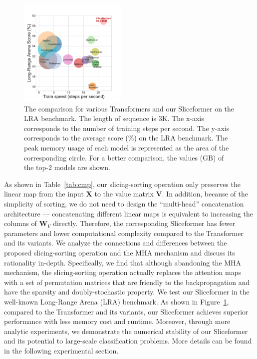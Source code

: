 \begin{figure}
  \centering
    \includegraphics[width=0.46\textwidth]{figures/lra-3.pdf}
    \caption{The comparison for various Transformers and our Sliceformer on the LRA benchmark. 
    The length of sequence is 3K.
    The x-axis corresponds to the number of training steps per second. 
    The y-axis corresponds to the average score (\%) on the LRA benchmark.
    The peak memory usage of each model is represented as the area of the corresponding circle. 
    For a better comparison, the values (GB) of the top-2 models are shown.}
    \label{fig:cmp}
\end{figure}


As shown in Table~\ref{tab:cmp}, our slicing-sorting operation only preserves the linear map from the input $\bm{X}$ to the value matrix $\bm{V}$. 
In addition, because of the simplicity of sorting, we do not need to design the ``multi-head'' concatenation architecture --- concatenating different linear maps is equivalent to increasing the columns of $\bm{W}_V$ directly. 
Therefore, the corresponding Sliceformer has fewer parameters and lower computational complexity compared to the Transformer and its variants. 
We analyze the connections and differences between the proposed slicing-sorting operation and the MHA mechanism and discuss its rationality in-depth. 
Specifically, we find that although abandoning the MHA mechanism, the slicing-sorting operation actually replaces the attention maps with a set of permutation matrices that are friendly to the backpropagation and have the sparsity and doubly-stochastic property. 
We test our Sliceformer in the well-known Long-Range Arena (LRA) benchmark. 
As shown in Figure~\ref{fig:cmp}, compared to the Transformer and its variants, our Sliceformer achieves superior performance with less memory cost and runtime. 
Moreover, through more analytic experiments, we demonstrate the numerical stability of our Sliceformer and its potential to large-scale classification problems.  
More details can be found in the following experimental section.
